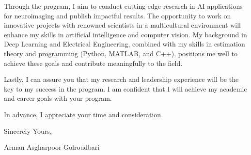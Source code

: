\documentclass[a4,10pt]{article}
\begin{document}
\begin{large}
\par
\vspace{-0.25cm} \quad Through the program, I aim to conduct cutting-edge research in AI applications for neuroimaging and publish impactful results. The opportunity to work on innovative projects with renowned scientists in a multicultural environment will enhance my skills in artificial intelligence and computer vision. My background in Deep Learning and Electrical Engineering, combined with my skills in estimation theory and programming (Python, MATLAB, and C++), positions me well to achieve these goals and contribute meaningfully to the field. \par
\quad Lastly, I can assure you that my research and leadership experience will be the key to my success in the program. I am confident that I will achieve my academic and career goals with your program. \par
In advance, I appreciate your time and consideration. \par
\vspace{-0.4cm} Sincerely Yours, \par
\vspace{-0.4cm}Arman Asgharpoor Golroudbari \par
\end{large}
\small


\end{document}
